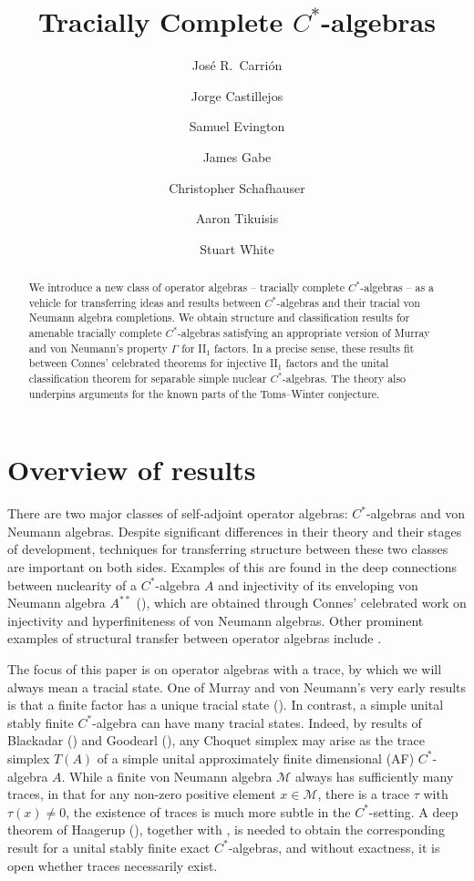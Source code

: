 \documentclass[a4paper,11pt]{amsart}
\title{Tracially Complete $C^*$-algebras}
\author[J.\ Carri\'on et al.]{Jos\'e R.\ Carri\'on}
\author[]{Jorge Castillejos}
\author[]{Samuel Evington}
\author[]{James Gabe}
\author[]{Christopher Schafhauser}
\author[]{Aaron Tikuisis}
\author[]{Stuart White}
\theoremstyle{definition}
\numberwithin{equation}{section}
\numberwithin{theorem}{section}
\newcommand{\M}{\mathcal{M}}
\DeclareRobustCommand{\SkipTocEntry}[5]{}
\begin{document}
\begin{abstract}
We introduce a new class of operator algebras -- tracially complete $C^*$-algebras -- as a vehicle for transferring ideas and results between $C^*$-algebras and their tracial von Neumann algebra completions. We obtain structure and classification results for amenable tracially complete $C^*$-algebras satisfying an appropriate version of Murray and von Neumann's property $\Gamma$ for II$_1$ factors. In a precise sense, these results fit between Connes' celebrated theorems for injective II$_1$ factors and the unital classification theorem for separable simple nuclear $C^*$-algebras. The theory also underpins arguments for the known parts of the Toms--Winter conjecture.
\end{abstract}

\maketitle

\section*{Overview of results}

\renewcommand{\thetheorem}{\Alph{theorem}} 

There are two major classes of self-adjoint operator algebras: $C^*$-algebras and von Neumann algebras. Despite significant differences in their theory and their stages of development, techniques for transferring structure between these two classes are important on both sides.
Examples of this are found in the deep connections between nuclearity of a $C^*$-algebra $A$ and injectivity of its enveloping von Neumann algebra $A^{**}$ (\cite{Co76,Choi-Effros76,Choi-Effros77,Effros-Lance77}), which are obtained through Connes' celebrated work on injectivity and hyperfiniteness of von Neumann algebras. Other prominent examples of structural transfer between operator algebras include \cite{Brown11,Haagerup83,MS12,MS14,Ozawa04,OP10}.
    




The focus of this paper is on operator algebras with a trace, by which we will always mean a tracial state. One of Murray and von Neumann's very early results is that a finite factor has a unique tracial state (\cite{MvN36, MvN37}).
In contrast, a simple unital stably finite $C^*$-algebra can have many tracial states. Indeed, by results of Blackadar (\cite{Bl80}) and Goodearl (\cite{Go77}), any Choquet simplex may arise as the trace simplex $T(A)$ of a simple unital approximately finite dimensional (AF) $C^*$-algebra $A$.  While a finite von Neumann algebra $\mathcal M$ always has sufficiently many traces, in that for any non-zero positive element $x\in\M$, there is a trace $\tau$ with $\tau(x)\neq 0$, the existence of traces is much more subtle in the $C^*$-setting. A deep theorem of Haagerup (\cite{Ha14}), together with \cite{Blackadar-Handelman, Blackadar-Rordam92}, is needed to obtain the corresponding result for a unital stably finite exact $C^*$-algebras, and without exactness, it is open whether traces necessarily exist.
\end{document}
